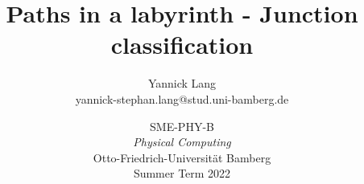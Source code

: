 \documentclass{article}
\title{Paths in a labyrinth - Junction classification}
\author{Yannick Lang\\
    \small yannick-stephan.lang@stud.uni-bamberg.de}
\date{ \vspace{0.5cm} \large 
  SME-PHY-B\\ 
  \emph{Physical Computing} \\ \vspace{0.2cm}
  Otto-Friedrich-Universität Bamberg \\ \vspace{0.2cm}
  Summer Term 2022}
\begin{document}
\newcommand{\IIC}{I\textsuperscript{2}C}

\maketitle













\printbibliography
\end{document}
